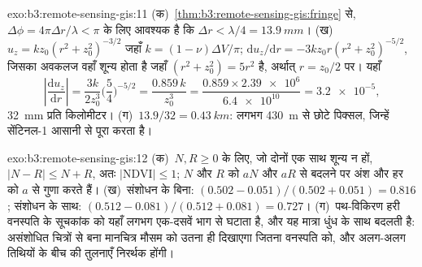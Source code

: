 \begin{solution}{exo:b3:remote-sensing-gis:11}
(क)~\cref{thm:b3:remote-sensing-gis:fringe} से, $\Delta\phi =
4\pi\Delta r/\lambda < \pi$ के लिए आवश्यक है कि $\Delta r < \lambda/4 =
\qty{13.9}{mm}$। (ख)~$u_z = k z_0(r^2 + z_0^2)^{-3/2}$ जहाँ $k = (1 -
\nu)\Delta V/\pi$; $\mathrm du_z/\mathrm dr = -3kz_0r(r^2 + z_0^2)^{-5/2}$,
जिसका अवकलज वहाँ शून्य होता है जहाँ $(r^2 + z_0^2) = 5r^2$ है, अर्थात् $r = z_0/2$ पर। यहाँ
\[
\left|\frac{\mathrm du_z}{\mathrm dr}\right| = \frac{3k}{2z_0^3}\Big(\frac54\Big)^{-5/2}
= \frac{0.859\,k}{z_0^3} = \frac{0.859\times\num{2.39e6}}{\num{6.4e10}} = \num{3.2e-5},
\]
\qty{32}{mm} प्रति किलोमीटर। (ग)~$13.9/32 = \qty{0.43}{km}$: लगभग
\qty{430}{m} से छोटे पिक्सल, जिन्हें सेंटिनल-1 आसानी से पूरा करता है।
\end{solution}

\begin{solution}{exo:b3:remote-sensing-gis:12}
(क)~$N, R \ge 0$ के लिए, जो दोनों एक साथ शून्य न हों, $|N - R| \le N + R$, अतः $|\mathrm{NDVI}|
\le 1$; $N$ और $R$ को $aN$ और $aR$ से बदलने पर अंश और
हर को $a$ से गुणा करते हैं। (ख)~संशोधन के बिना: $(0.502 - 0.051)/(0.502 + 0.051) =
0.816$; संशोधन के साथ: $(0.512 - 0.081)/(0.512 + 0.081) = 0.727$। (ग)~पथ-विकिरण
हरी वनस्पति के सूचकांक को यहाँ लगभग एक-दसवें भाग से घटाता है, और
यह मात्रा धुंध के साथ बदलती है: असंशोधित चित्रों से बना मानचित्र
मौसम को उतना ही दिखाएगा जितना वनस्पति को, और अलग-अलग तिथियों के बीच की
तुलनाएँ निरर्थक होंगी।
\end{solution}

